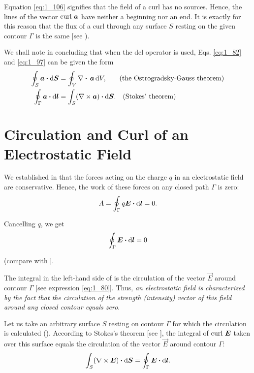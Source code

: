 Equation \eqref{eq:1_106} signifies that the field of a curl has no sources. Hence, the lines of the vector $\text{curl~}\boldsymbol{a}$ have neither a beginning nor an end. It is exactly for this reason that the flux of a curl through any surface $S$ resting on the given contour $\Gamma$ is the same [see ).

We shall note in concluding that when the del operator is used, Eqs. \eqref{eq:1_82} and \eqref{eq:1_97} can be given the form
\begin{align}
	\oint_S \boldsymbol{a} \boldsymbol{\cdot} \mathrm{d}\boldsymbol{S} &= \oint_V \nabla\boldsymbol{\cdot}\,\boldsymbol{a}\, \mathrm{d} V,\quad\quad\! \text{(the Ostrogradsky-Gauss theorem)}\label{eq:1_108}\\
	\oint_{\Gamma} \boldsymbol{a} \boldsymbol{\cdot} \mathrm{d}\boldsymbol{l} &= \int_S (\nabla\times\boldsymbol{a}) \boldsymbol{\cdot} \mathrm{d}\boldsymbol{S}.\quad \text{(Stokes' theorem)}\label{eq:1_109}
\end{align}

\section{Circulation and Curl of an Electrostatic Field}\label{sec:1_12}

We established in  that the forces acting on the charge $q$ in an electrostatic field are conservative. Hence, the work of these forces on any closed path $\Gamma$ is zero:
\begin{equation*}
	A = \oint_{\Gamma} q\boldsymbol{E} \boldsymbol{\cdot} \mathrm{d}\boldsymbol{l} = 0.
\end{equation*}

\noindent
Cancelling $q$, we get
\begin{equation}\label{eq:1_110}
	\oint_{\Gamma} \boldsymbol{E} \boldsymbol{\cdot} \mathrm{d}\boldsymbol{l} = 0
\end{equation}

\noindent
(compare with ].

The integral in the left-hand side of  is the circulation of the vector $\vec{E}$ around contour $\Gamma$ [see expression \eqref{eq:1_80}]. Thus, \textit{an electrostatic field is characterized by the fact that the circulation of the strength (intensity) vector of this field around any closed contour equals zero}.

Let us take an arbitrary surface $S$ resting on contour $\Gamma$ for which the circulation is calculated (). According to Stokes's
theorem [see ], the integral of $\text{curl~}\boldsymbol{E}$ taken over this surface equals the circulation of the vector $\vec{E}$ around contour $\Gamma$:
\begin{equation}\label{eq:1_111}
	\int_S (\nabla\times\boldsymbol{E}) \boldsymbol{\cdot} \mathrm{d}\boldsymbol{S} = \oint_{\Gamma} \boldsymbol{E} \boldsymbol{\cdot} \mathrm{d}\boldsymbol{l}.
\end{equation}

